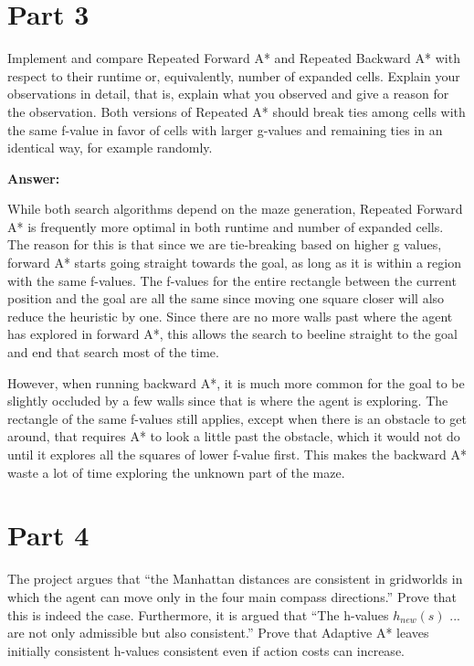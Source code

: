 \documentclass{article}
\begin{document}
\newpage
\section*{Part 3}
Implement and compare Repeated Forward A* and Repeated Backward A* with respect to their runtime or, equivalently, number of expanded cells. Explain your observations in detail, that is, explain what you observed and give a reason for the observation. Both versions of Repeated A* should break ties among cells with the same f-value in favor of cells with larger g-values and remaining ties in an identical way, for example randomly.

{\color{blue} \textbf{Answer:}

While both search algorithms depend on the maze generation, Repeated Forward A* is frequently more optimal in both runtime and number of expanded cells. The reason for this is that since we are tie-breaking based on higher g values, forward A* starts going straight towards the goal, as long as it is within a region with the same f-values. The f-values for the entire rectangle between the current position and the goal are all the same since moving one square closer will also reduce the heuristic by one. Since there are no more walls past where the agent has explored in forward A*, this allows the search to beeline straight to the goal and end that search most of the time.

However, when running backward A*, it is much more common for the goal to be slightly occluded by a few walls since that is where the agent is exploring. The rectangle of the same f-values still applies, except when there is an obstacle to get around, that requires A* to look a little past the obstacle, which it would not do until it explores all the squares of lower f-value first. This makes the backward A* waste a lot of time exploring the unknown part of the maze.
}

\newpage
\section*{Part 4}
The project argues that “the Manhattan distances are consistent in gridworlds in which the agent can move only in the four main compass directions.” Prove that this is indeed the case. Furthermore, it is argued that “The h-values $h_{new} (s)$ ... are not only admissible but also consistent.” Prove that Adaptive A* leaves initially consistent h-values consistent even if action costs can increase.
\end{document}

